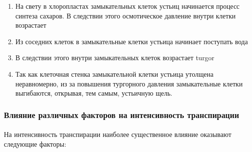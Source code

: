 \begin{enumerate}
	\item На свету в хлоропластах замыкательных клеток устьиц начинается процесс синтеза сахаров. В следствии этого осмотическое давление внутри клетки возрастает
	\item Из соседних клеток в замыкательные клетки устьица начинает поступать вода
	\item В следствии этого внутри замыкательных клеток возрастает \gls{turgor}
	\item Так как клеточная стенка замыкательной клетки устьица утолщена неравномерно, из за повышения тургорного давления замыкательные клетки выгибаются, открывая, тем самым, устьичную щель. 
\end{enumerate}

\subsubsection*{Влияние различных факторов на интенсивность транспирации}

\paragraph*{}На интенсивность транспирации наиболее существенное влияние оказывают следующие факторы:

